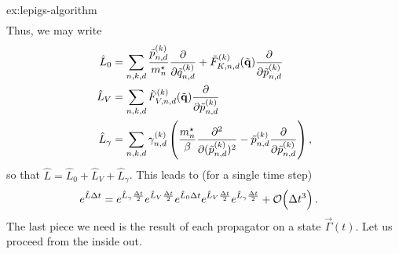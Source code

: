\begin{DefAnswer}{ex:lepigs-algorithm}
\begin{subequations}
\begin{align}
	\end{align}
	\end{subequations}
	Thus, we may write
	\begin{subequations}
	\begin{align}
		\hat{L}_0
		&= \sum_{n,k,d}
				\frac{\tilde{p}_{n,d}^{(k)}}{{m}^\star_n} \frac{\partial}{\partial \tilde{q}_{n,d}^{(k)}}
				+ \tilde{F}_{K,n,d}^{(k)}(\tilde{\bm{\mathbf{q}}}) \frac{\partial}{\partial \tilde{p}_{n,d}^{(k)}} \\
		\hat{L}_V
		&= \sum_{n,k,d}
				\tilde{F}_{V,n,d}^{(k)}(\tilde{\bm{\mathbf{q}}}) \frac{\partial}{\partial \tilde{p}_{n,d}^{(k)}} \\
		\hat{L}_\gamma
		&= \sum_{n,k,d} \gamma_{n,d}^{(k)} \left(
				\frac{{m}^\star_n}{\beta} \frac{\partial^2}{\partial (\tilde{p}_{n,d}^{(k)})^2}
				- \tilde{p}_{n,d}^{(k)} \frac{\partial}{\partial \tilde{p}_{n,d}^{(k)}}
			\right),
	\end{align}
	\end{subequations}
	so that $\hat{L} = \hat{L}_0 + \hat{L}_V + \hat{L}_\gamma$.
	This leads to (for a single time step)~\cite{tuckerman1992reversible,bussi2007accurate}
	\begin{align}
		e^{\hat{L} \Delta t}
		&= e^{\hat{L}_\gamma \frac{\Delta t}{2}}
				e^{\hat{L}_V \frac{\Delta t}{2}}
				e^{\hat{L}_0 \Delta t}
				e^{\hat{L}_V \frac{\Delta t}{2}}
				e^{\hat{L}_\gamma \frac{\Delta t}{2}}
			+ \mathcal{O}\!\left( \Delta t^3 \right).
	\end{align}
	The last piece we need is the result of each propagator on a state $\vec{\Gamma}(t)$.
	Let us proceed from the inside out.


\end{DefAnswer}
